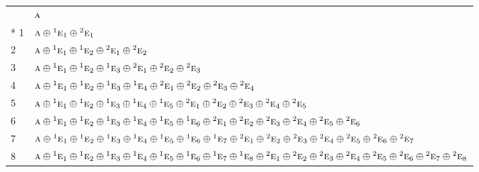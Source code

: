 \documentclass[10pt,a4paper]{article}
\numberwithin{equation}{section}
\newcommand{\irr}[1]{\text{\normalfont\scshape #1}}
\newcommand{\conjpair}[1]{{}^{#1}}
\newlength{\fillwidth}\newlength{\cellwidth}\newlength{\colwidth}
\begin{document}
{\begin{longtable}{@{}l>{\RaggedRight\arraybackslash}p{\fillwidth}@{}}
\bottomrule\endfoot\endlastfoot
0 & $\irr{a}$\\*
1 & $\irr{a} \oplus \conjpair{1}\irr{e}_{1} \oplus \conjpair{2}\irr{e}_{1}$\\
2 & $\irr{a} \oplus \conjpair{1}\irr{e}_{1} \oplus \conjpair{1}\irr{e}_{2} \oplus \conjpair{2}\irr{e}_{1} \oplus \conjpair{2}\irr{e}_{2}$\\
3 & $\irr{a} \oplus \conjpair{1}\irr{e}_{1} \oplus \conjpair{1}\irr{e}_{2} \oplus \conjpair{1}\irr{e}_{3} \oplus \conjpair{2}\irr{e}_{1} \oplus \conjpair{2}\irr{e}_{2} \oplus \conjpair{2}\irr{e}_{3}$\\
4 & $\irr{a} \oplus \conjpair{1}\irr{e}_{1} \oplus \conjpair{1}\irr{e}_{2} \oplus \conjpair{1}\irr{e}_{3} \oplus \conjpair{1}\irr{e}_{4} \oplus \conjpair{2}\irr{e}_{1} \oplus \conjpair{2}\irr{e}_{2} \oplus \conjpair{2}\irr{e}_{3} \oplus \conjpair{2}\irr{e}_{4}$\\
5 & $\irr{a} \oplus \conjpair{1}\irr{e}_{1} \oplus \conjpair{1}\irr{e}_{2} \oplus \conjpair{1}\irr{e}_{3} \oplus \conjpair{1}\irr{e}_{4} \oplus \conjpair{1}\irr{e}_{5} \oplus \conjpair{2}\irr{e}_{1} \oplus \conjpair{2}\irr{e}_{2} \oplus \conjpair{2}\irr{e}_{3} \oplus \conjpair{2}\irr{e}_{4} \oplus \conjpair{2}\irr{e}_{5}$\\
6 & $\irr{a} \oplus \conjpair{1}\irr{e}_{1} \oplus \conjpair{1}\irr{e}_{2} \oplus \conjpair{1}\irr{e}_{3} \oplus \conjpair{1}\irr{e}_{4} \oplus \conjpair{1}\irr{e}_{5} \oplus \conjpair{1}\irr{e}_{6} \oplus \conjpair{2}\irr{e}_{1} \oplus \conjpair{2}\irr{e}_{2} \oplus \conjpair{2}\irr{e}_{3} \oplus \conjpair{2}\irr{e}_{4} \oplus \conjpair{2}\irr{e}_{5} \oplus \conjpair{2}\irr{e}_{6}$\\
7 & $\irr{a} \oplus \conjpair{1}\irr{e}_{1} \oplus \conjpair{1}\irr{e}_{2} \oplus \conjpair{1}\irr{e}_{3} \oplus \conjpair{1}\irr{e}_{4} \oplus \conjpair{1}\irr{e}_{5} \oplus \conjpair{1}\irr{e}_{6} \oplus \conjpair{1}\irr{e}_{7} \oplus \conjpair{2}\irr{e}_{1} \oplus \conjpair{2}\irr{e}_{2} \oplus \conjpair{2}\irr{e}_{3} \oplus \conjpair{2}\irr{e}_{4} \oplus \conjpair{2}\irr{e}_{5} \oplus \conjpair{2}\irr{e}_{6} \oplus \conjpair{2}\irr{e}_{7}$\\
8 & $\irr{a} \oplus \conjpair{1}\irr{e}_{1} \oplus \conjpair{1}\irr{e}_{2} \oplus \conjpair{1}\irr{e}_{3} \oplus \conjpair{1}\irr{e}_{4} \oplus \conjpair{1}\irr{e}_{5} \oplus \conjpair{1}\irr{e}_{6} \oplus \conjpair{1}\irr{e}_{7} \oplus \conjpair{1}\irr{e}_{8} \oplus \conjpair{2}\irr{e}_{1} \oplus \conjpair{2}\irr{e}_{2} \oplus \conjpair{2}\irr{e}_{3} \oplus \conjpair{2}\irr{e}_{4} \oplus \conjpair{2}\irr{e}_{5} \oplus \conjpair{2}\irr{e}_{6} \oplus \conjpair{2}\irr{e}_{7} \oplus \conjpair{2}\irr{e}_{8}$\\

\end{longtable}}
\end{document}
